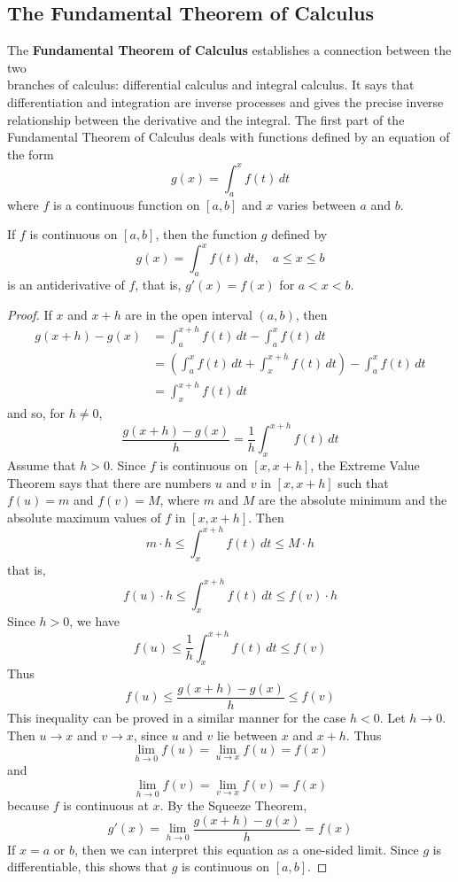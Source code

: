 \subsection{The Fundamental Theorem of Calculus}

The \textbf{Fundamental Theorem of Calculus} establishes a connection between the two \\
branches of calculus: differential calculus and integral calculus.
It says that differentiation and integration are inverse processes and gives
the precise inverse relationship between the derivative and the integral.
The first part of the Fundamental Theorem of Calculus deals with functions
defined by an equation of the form
\[g(x)=\int_a^x f(t)\,dt\]
where \(f\) is a continuous function on \([a,b]\) and \(x\) varies between
\(a\) and \(b\).
\begin{theorem}
    If \(f\) is continuous on \([a,b]\), then the function \(g\) defined by
    \[g(x)=\int_a^x f(t)\,dt,\quad a\leq x\leq b\]
    is an antiderivative of \(f\), that is, \(g'(x)=f(x)\) for \(a<x<b\).
\end{theorem}
\begin{proof}
    If \(x\) and \(x+h\) are in the open interval \((a,b)\), then
    \begin{align*}
        g(x+h)-g(x) &= \int_a^{x+h}f(t)\,dt-\int_a^x f(t)\,dt \\
        &= \left(\int_a^x f(t)\,dt+\int_x^{x+h}f(t)\,dt\right)
        -\int_a^x f(t)\,dt \\
        &= \int_x^{x+h}f(t)\,dt
    \end{align*}
    and so, for \(h\neq 0\),
    \[\frac{g(x+h)-g(x)}{h}=\frac{1}{h}\int_x^{x+h}f(t)\,dt\]
    Assume that \(h>0\).
    Since \(f\) is continuous on \([x,x+h]\), the Extreme Value Theorem says
    that there are numbers \(u\) and \(v\) in \([x,x+h]\) such that \(f(u)=m\)
    and \(f(v)=M\), where \(m\) and \(M\) are the absolute minimum and the
    absolute maximum values of \(f\) in \([x,x+h]\).
    Then
    \[m\cdot h\leq\int_x^{x+h}f(t)\,dt\leq M\cdot h\]
    that is,
    \[f(u)\cdot h\leq\int_x^{x+h}f(t)\,dt\leq f(v)\cdot h\]
    Since \(h>0\), we have
    \[f(u)\leq\frac{1}{h}\int_x^{x+h}f(t)\,dt\leq f(v)\]
    Thus
    \[f(u)\leq\frac{g(x+h)-g(x)}{h}\leq f(v)\]
    This inequality can be proved in a similar manner for the case \(h<0\).
    Let \(h\to 0\).
    Then \(u\to x\) and \(v\to x\), since \(u\) and \(v\) lie between \(x\)
    and \(x+h\).
    Thus
    \[\lim_{h\to 0}f(u)=\lim_{u\to x}f(u)=f(x)\]
    and
    \[\lim_{h\to 0}f(v)=\lim_{v\to x}f(v)=f(x)\]
    because \(f\) is continuous at \(x\).
    By the Squeeze Theorem,
    \[g'(x)=\lim_{h\to 0}\frac{g(x+h)-g(x)}{h}=f(x)\]
    If \(x=a\) or \(b\), then we can interpret this equation as a one-sided
    limit.
    Since \(g\) is differentiable, this shows that  \(g\) is continuous on
    \([a,b]\).
\end{proof}
